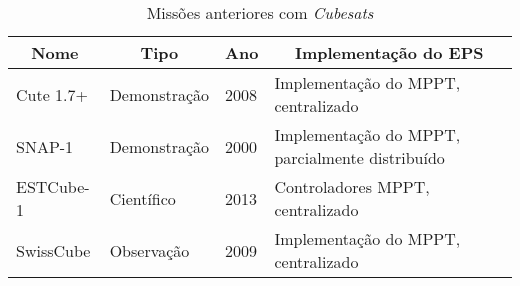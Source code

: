 \begin{table}[H]
\centering
\caption{Missões anteriores com \textit{Cubesats}}
\label{history_table}
\begin{tabular}{|l|l|l|l|} 
\hline
\multicolumn{1}{|c|}{Nome} & \multicolumn{1}{c|}{Tipo} & \multicolumn{1}{c|}{Ano} & \multicolumn{1}{c|}{Implementação do EPS}  \\ 
\hline
Cute 1.7+                  & Demonstração              & 2008                     &  Implementação do MPPT, centralizado  \\ 
\hline
SNAP-1                     & Demonstração              & 2000                     &  Implementação do MPPT, parcialmente distribuído  \\
\hline
ESTCube-1                  & Científico                & 2013                     &  Controladores MPPT, centralizado     \\ 
\hline
SwissCube                  & Observação                & 2009                     &  Implementação do MPPT, centralizado  \\
\hline
\end{tabular}
\end{table}